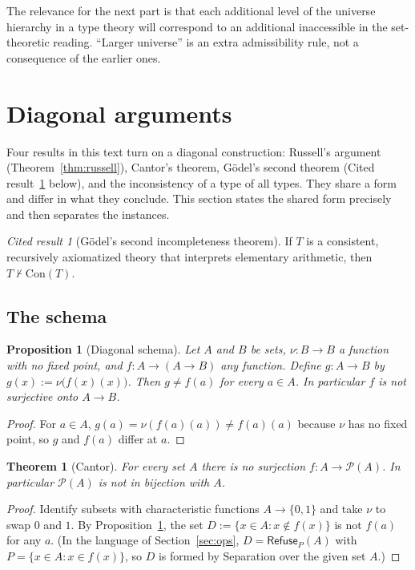 \documentclass[11pt]{article}
\newcommand{\Refuse}{\mathsf{Refuse}}
\newcommand{\Pow}{\mathcal{P}}
\theoremstyle{definition}
\theoremstyle{plain}
\newtheorem{theorem}[definition]{Theorem}
\newtheorem{proposition}[definition]{Proposition}
\theoremstyle{remark}
\newtheorem{cited}[definition]{Cited result}
\begin{document}
The relevance for the next part is that each additional level of the universe hierarchy in a type theory will correspond to an additional inaccessible in the set-theoretic reading. ``Larger universe'' is an extra admissibility rule, not a consequence of the earlier ones.

\section{Diagonal arguments}\label{sec:diag}

Four results in this text turn on a diagonal construction: Russell's argument (Theorem~\ref{thm:russell}), Cantor's theorem, G\"odel's second theorem (Cited result~\ref{cit:godel2} below), and the inconsistency of a type of all types. They share a form and differ in what they conclude. This section states the shared form precisely and then separates the instances.

\begin{cited}[G\"odel's second incompleteness theorem]\label{cit:godel2}
If $T$ is a consistent, recursively axiomatized theory that interprets elementary arithmetic, then $T\nvdash\mathrm{Con}(T)$.
\end{cited}

\subsection{The schema}

\begin{proposition}[Diagonal schema]\label{prop:diagschema}
Let $A$ and $B$ be sets, $\nu:B\to B$ a function with no fixed point, and $f:A\to(A\to B)$ any function. Define $g:A\to B$ by $g(x):=\nu\big(f(x)(x)\big)$. Then $g\ne f(a)$ for every $a\in A$. In particular $f$ is not surjective onto $A\to B$.
\end{proposition}
\begin{proof}
For $a\in A$, $g(a)=\nu(f(a)(a))\ne f(a)(a)$ because $\nu$ has no fixed point, so $g$ and $f(a)$ differ at $a$.
\end{proof}

\begin{theorem}[Cantor]\label{thm:cantor}
For every set $A$ there is no surjection $f:A\to\Pow(A)$. In particular $\Pow(A)$ is not in bijection with $A$.
\end{theorem}
\begin{proof}
Identify subsets with characteristic functions $A\to\{0,1\}$ and take $\nu$ to swap $0$ and $1$. By Proposition~\ref{prop:diagschema}, the set $D:=\{x\in A:x\notin f(x)\}$ is not $f(a)$ for any $a$. (In the language of Section~\ref{sec:ops}, $D=\Refuse_P(A)$ with $P=\{x\in A:x\in f(x)\}$, so $D$ is formed by Separation over the given set $A$.)
\end{proof}
\end{document}
